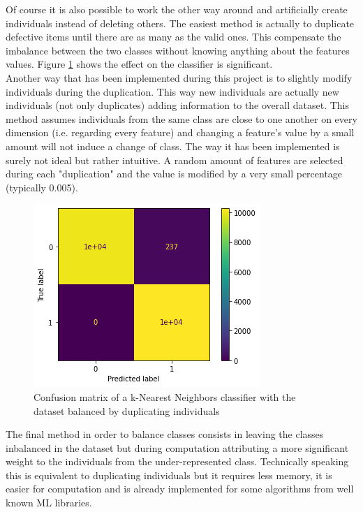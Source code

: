 Of course it is also possible to work the other way around and artificially create individuals instead of deleting others. The easiest method is actually to duplicate defective items until there are as many as the valid ones. This compensate the imbalance between the two classes without knowing anything about the features values. Figure \ref{data_preparation_3} shows the effect on the classifier is significant.\\
Another way that has been implemented during this project is to slightly modify individuals during the duplication. This way new individuals are actually new individuals (not only duplicates) adding information to the overall dataset. This method assumes individuals from the same class are close to one another on every dimension (i.e. regarding every feature) and changing a feature's value by a small amount will not induce a change of class. The way it has been implemented is surely not ideal but rather intuitive. A random amount of features are selected during each "duplication" and the value is modified by a very small percentage (typically 0.005).\\

\begin{figure}
    \center
    \includegraphics[scale=.5]{img/data_preparation_3.png}
    \caption{Confusion matrix of a k-Nearest Neighbors classifier with the dataset balanced by duplicating individuals}
    \label{data_preparation_3}
\end{figure}

The final method in order to balance classes consists in leaving the classes inbalanced in the dataset but during computation attributing a more significant weight to the individuals from the under-represented class. Technically speaking this is equivalent to duplicating individuals but it requires less memory, it is easier for computation and is already implemented for some algorithms from well known ML libraries.  